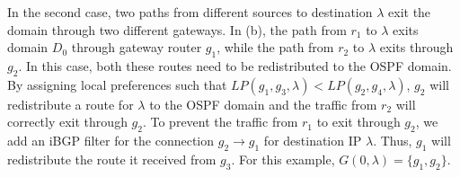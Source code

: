 
In the second case, two paths from different sources to
destination $\lambda$ exit
the domain through two different
gateways. In (b),
the path from $r_1$ to $\lambda$ exits domain $D_0$ through 
gateway router $g_1$, while the path from $r_2$  to $\lambda$ exits 
through $g_2$. 
In this case, both these routes need to be  
redistributed to the OSPF domain. 
By assigning local preferences such that
$LP(g_1,g_3,\lambda)<LP(g_2,g_4,\lambda)$,
 $g_2$ will redistribute a route for $\lambda$ 
 to the OSPF domain and
the traffic from $r_2$ will correctly exit through $g_2$. 
To prevent the traffic from $r_1$ to exit through $g_2$,
we add an iBGP filter
 for the connection $g_2 \rightarrow g_1$ for
destination IP $\lambda$. 
Thus, $g_1$ will 
redistribute the route it received from $g_3$. For 
this example, $G(0, \lambda) = \{g_1, g_2\}$. 

\begin{figure}
	\centering
	\hfill
	\hfill
\end{figure}

